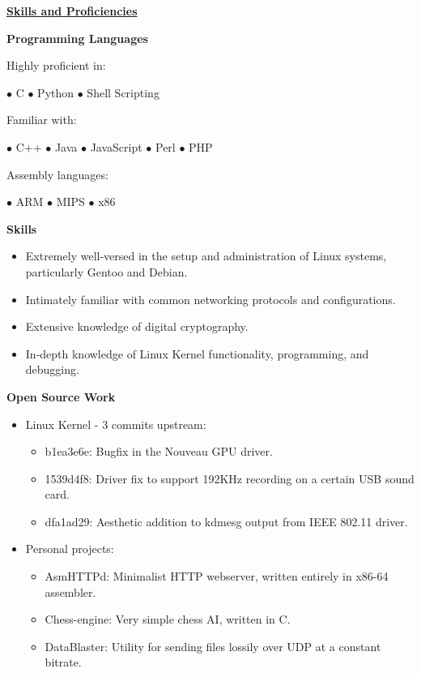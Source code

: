 \documentclass[11pt]{article}
\begin{document}
\noindent
\hrulefill

\centerline{\underline{\bf Skills and Proficiencies}}

\begin{multicols}{2}

\centerline{\bf Programming Languages}
\bigskip
\noindent Highly proficient in:\\
\centerline{\hfill $\bullet$ C \hfill $\bullet$ Python \hfill $\bullet$ Shell Scripting \hfill}
\noindent Familiar with:\\
\centerline{\hfill $\bullet$ C++ \hfill $\bullet$ Java \hfill $\bullet$ JavaScript \hfill $\bullet$ Perl \hfill $\bullet$ PHP \hfill}
\noindent Assembly languages:\\
\centerline{\hfill $\bullet$ ARM \hfill $\bullet$ MIPS \hfill $\bullet$ x86 \hfill}

\bigskip

\centerline{\bf Skills}
\begin{itemize}[leftmargin=*]
\itemsep 0em
	\item Extremely well-versed in the setup and administration of Linux
	systems, particularly Gentoo and Debian.
	\item Intimately familiar with common networking protocols and configurations.
	\item Extensive knowledge of digital cryptography.
	\item In-depth knowledge of Linux Kernel functionality, programming, and debugging.
\end{itemize}

\columnbreak

\centerline{\bf Open Source Work}
\begin{itemize}[leftmargin=*]
\itemsep 0em
	\item Linux Kernel - 3 commits upstream:
	\begin{itemize}
	\itemsep 0em
		\item b1ea3e6e: Bugfix in the Nouveau GPU driver.
		\item 1539d4f8: Driver fix to support 192KHz recording on a certain USB sound card.
		\item dfa1ad29: Aesthetic addition to kdmesg output from IEEE 802.11 driver.
	\end{itemize}
	\item Personal projects:
	\begin{itemize}
	\itemsep 0em
		\item AsmHTTPd: Minimalist HTTP webserver, written entirely in x86-64 assembler.
		\item Chess-engine: Very simple chess AI, written in C.
		\item DataBlaster: Utility for sending files lossily over UDP at a constant bitrate.
	\end{itemize}
\end{itemize}

\end{multicols}
\end{document}
